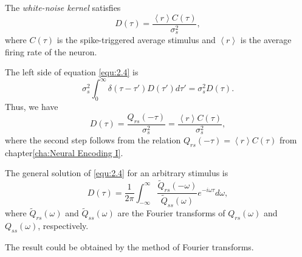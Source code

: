 \begin{prop}
  \label{prop:WhiteOptimalKernel}
  The \emph{white-noise kernel} satisfies
  \begin{equation}
    \label{equ:2.6}
    D(\tau) = \frac{\left<r\right>C(\tau)}{\sigma_s^2},
  \end{equation}
  where $C(\tau)$ is the spike-triggered average stimulus and $\left<r\right>$ is the average firing rate of the neuron.
\end{prop}
\begin{solution}
  The left side of equation \ref{equ:2.4} is
  \begin{equation}
    \label{equ:2.5}
    \sigma_s^2\int_0^{\infty}\delta(\tau-\tau')D(\tau')d\tau' = \sigma_s^2D(\tau).
  \end{equation}
  Thus, we have
  \begin{equation}
    \label{equ:2.6}
    D(\tau) = \frac{Q_{rs}(-\tau)}{\sigma_s^2} = \frac{\left<r\right>C(\tau)}{\sigma_s^2},
  \end{equation}
  where the second step follows from the relation $Q_{rs}(-\tau) = \left<r\right>C(\tau)$ from chapter\ref{cha:Neural Encoding I}.
\end{solution}

\begin{prop}
  \label{prop:generalOptimalKernel}
  The general solution of \ref{equ:2.4} for an arbitrary stimulus is
  \begin{equation}
    \label{equ:2.59}
    D(\tau) = \frac{1}{2\pi}\int_{-\infty}^{\infty}\frac{\tilde{Q}_{rs}(-\omega)}{\tilde{Q}_{ss}(\omega)}e^{-i\omega\tau}d\omega,
  \end{equation}
  where $\tilde{Q}_{rs}(\omega)$ and $\tilde{Q}_{ss}(\omega)$ are the Fourier transforms of $Q_{rs}(\omega)$ and $Q_{ss}(\omega)$, respectively.
\end{prop}

\begin{solution}
  The result could be obtained by the method of Fourier transforms.
\end{solution}

